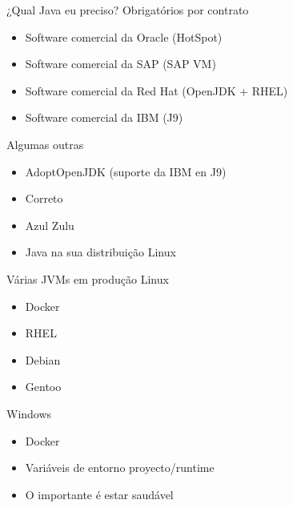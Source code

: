 \documentclass[aspectratio=169]{beamer}
\begin{document}
\begin{frame}[fragile]{¿Qual Java eu preciso?}
    Obrigatórios por contrato
    \begin{itemize}
        \item Software comercial da Oracle (HotSpot)
        \item Software comercial da SAP (SAP VM)
        \item Software comercial da Red Hat (OpenJDK + RHEL)
        \item Software comercial da IBM (J9)
    \end{itemize}
    Algumas outras
\begin{itemize}
    \item AdoptOpenJDK (suporte da IBM en J9)
    \item Correto
    \item Azul Zulu
    \item Java na sua distribuição Linux
\end{itemize}
\end{frame}

\begin{frame}[fragile]{Várias JVMs em produção}
    Linux
    \begin{itemize}
        \item Docker
        \item RHEL
        \item Debian
        \item Gentoo
    \end{itemize}
    Windows
    \begin{itemize}
        \item Docker
        \item Variáveis de entorno proyecto/runtime
        \item O importante é estar saudável
    \end{itemize}
\end{frame}
\end{document}
